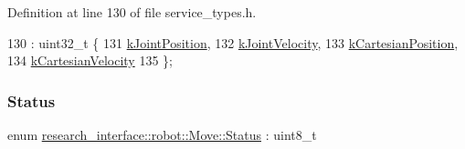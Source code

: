 Definition at line 130 of file service\+\_\+types.\+h.


\begin{DoxyCode}
130                                  : uint32\_t \{
131     \hyperlink{namespaceresearch__interface_1_1robot_abd2451eb963a1843f1eb066ebd4b06e8a3a31dc92434874cc44c61e876b8bd35f}{kJointPosition},
132     \hyperlink{namespaceresearch__interface_1_1robot_abd2451eb963a1843f1eb066ebd4b06e8a729c7783e4ea7890b50022b1194e89d6}{kJointVelocity},
133     \hyperlink{namespaceresearch__interface_1_1robot_abd2451eb963a1843f1eb066ebd4b06e8ad05aa68e21654f0d7f3672e6827366b6}{kCartesianPosition},
134     \hyperlink{namespaceresearch__interface_1_1robot_abd2451eb963a1843f1eb066ebd4b06e8ad42e39826eabd261aa1d29c15be8e433}{kCartesianVelocity}
135   \};
\end{DoxyCode}
\mbox{\label{structresearch__interface_1_1robot_1_1Move_a74e15d249324a1b2d28f0a7cf50dc794}} 
\subsubsection{\texorpdfstring{Status}{Status}}
{\footnotesize\ttfamily enum \hyperlink{structresearch__interface_1_1robot_1_1Move_a74e15d249324a1b2d28f0a7cf50dc794}{research\+\_\+interface\+::robot\+::\+Move\+::\+Status} \+: uint8\+\_\+t\hspace{0.3cm}{\ttfamily [strong]}}

